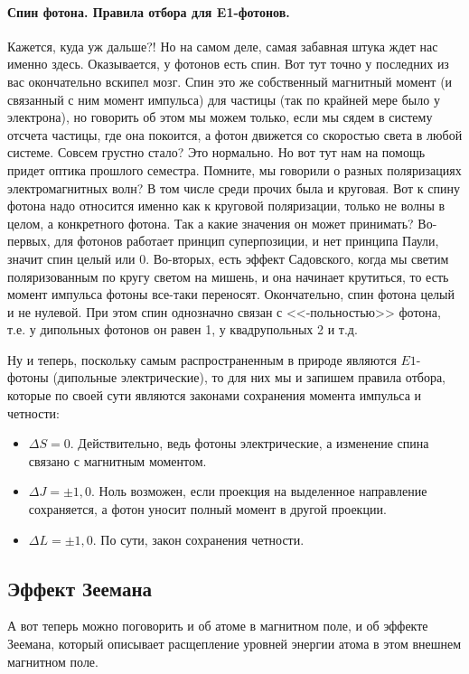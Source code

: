 \documentclass[12pt]{article}
\begin{document}
\paragraph{Спин фотона. Правила отбора для E1-фотонов.} Кажется, куда уж дальше?! Но на самом деле, самая забавная штука ждет нас именно здесь. Оказывается, у фотонов есть спин. Вот тут точно у последних из вас окончательно вскипел мозг. Спин это же собственный магнитный момент (и связанный с ним момент импульса) для частицы (так по крайней мере было у электрона), но говорить об этом мы можем только, если мы сядем в систему отсчета частицы, где она покоится, а фотон движется со скоростью света в любой системе.  Совсем грустно стало? Это нормально. Но вот тут нам на помощь придет оптика прошлого семестра. Помните, мы говорили о разных поляризациях электромагнитных волн? В том числе среди прочих была и круговая. Вот к спину фотона надо относится именно как к круговой поляризации, только не волны в целом, а конкретного фотона. Так а какие значения он может принимать? Во-первых, для фотонов работает принцип суперпозиции, и нет принципа Паули, значит спин целый или 0. Во-вторых, есть эффект Садовского, когда мы светим поляризованным по кругу светом на мишень, и она начинает крутиться, то есть момент импульса фотоны все-таки переносят. Окончательно, спин фотона целый и не нулевой. При этом спин однозначно связан с <<-польностью>> фотона, т.е. у дипольных фотонов он равен 1, у квадрупольных 2 и т.д.

\vspace{1em} \noindent
Ну и теперь, поскольку самым распространенным в природе являются $E1$- фотоны (дипольные электрические), то для них мы и запишем правила отбора, которые по своей сути являются законами сохранения момента импульса и четности:
\begin{itemize}
    \item $\Delta S =0$. Действительно, ведь фотоны электрические, а изменение спина связано с магнитным моментом.
    \item $\Delta J = \pm 1, 0$. Ноль возможен, если проекция на выделенное направление сохраняется, а фотон уносит полный момент в другой проекции.
    \item $\Delta L = \pm 1, 0$. По сути, закон сохранения четности.
\end{itemize}

\subsection{Эффект Зеемана}
А вот теперь можно поговорить и об атоме в магнитном поле, и об эффекте Зеемана, который описывает расщепление уровней энергии атома в этом внешнем магнитном поле.
\end{document}
